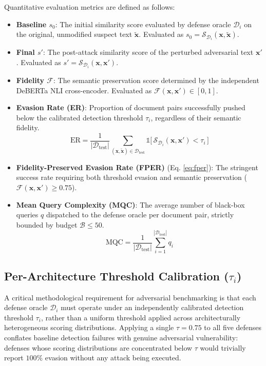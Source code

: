 \documentclass[conference,onecolumn,11pt]{IEEEtran}
\begin{document}
Quantitative evaluation metrics are defined as follows:
\begin{itemize}
    \item \textbf{Baseline $s_0$}: The initial similarity score evaluated by defense oracle $\mathcal{D}_i$ on the original, unmodified suspect text $\mathbf{\tilde{x}}$. Evaluated as $s_0 = \mathcal{S}_{\mathcal{D}_i}(\mathbf{x}, \mathbf{\tilde{x}})$.
    \item \textbf{Final $s'$}: The post-attack similarity score of the perturbed adversarial text $\mathbf{x}'$. Evaluated as $s' = \mathcal{S}_{\mathcal{D}_i}(\mathbf{x}, \mathbf{x}')$.
    \item \textbf{Fidelity $\mathcal{F}$}: The semantic preservation score determined by the independent DeBERTa NLI cross-encoder. Evaluated as $\mathcal{F}(\mathbf{x}, \mathbf{x}') \in [0, 1]$.
    \item \textbf{Evasion Rate (ER)}: Proportion of document pairs successfully pushed below the calibrated detection threshold $\tau_i$, regardless of their semantic fidelity.
    \begin{equation}
        \text{ER} = \frac{1}{|\mathcal{D}_{\text{test}}|} \sum_{(\mathbf{x}, \mathbf{\tilde{x}}) \in \mathcal{D}_{\text{test}}} \mathbb{1}\big[\, \mathcal{S}_{\mathcal{D}_i}(\mathbf{x}, \mathbf{x}') < \tau_i \,\big]
    \end{equation}
    \item \textbf{Fidelity-Preserved Evasion Rate (FPER)} (Eq. \ref{eq:fper}): The stringent success rate requiring both threshold evasion and semantic preservation ($\mathcal{F}(\mathbf{x}, \mathbf{x}') \ge 0.75$).
    \item \textbf{Mean Query Complexity (MQC)}: The average number of black-box queries $q$ dispatched to the defense oracle per document pair, strictly bounded by budget $\mathcal{B} \le 50$.
    \begin{equation}
        \text{MQC} = \frac{1}{|\mathcal{D}_{\text{test}}|} \sum_{i=1}^{|\mathcal{D}_{\text{test}}|} q_i
    \end{equation}
\end{itemize}

\subsection{Per-Architecture Threshold Calibration ($\tau_i$)}

A critical methodological requirement for adversarial benchmarking is that each defense oracle $\mathcal{D}_i$ must operate under an independently calibrated detection threshold $\tau_i$, rather than a uniform threshold applied across architecturally heterogeneous scoring distributions. Applying a single $\tau = 0.75$ to all five defenses conflates baseline detection failures with genuine adversarial vulnerability: defenses whose scoring distributions are concentrated below $\tau$ would trivially report $100\%$ evasion without any attack being executed.
\end{document}
